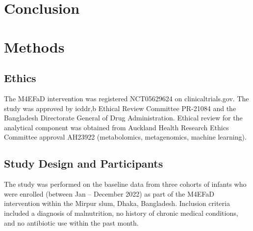 \documentclass{article}
\begin{document}
\section*{Conclusion}

\section*{Methods}
\subsection*{Ethics}
The M4EFaD intervention was registered NCT05629624 on clinicaltrials.gov.
The study was approved by icddr,b Ethical Review Committee PR-21084 and the Bangladesh Directorate General of Drug Administration.
Ethical review for the analytical component was obtained from Auckland Health Research Ethics Committee approval AH23922 (metabolomics, metagenomics, machine learning).

\subsection*{Study Design and Participants}
The study was performed on the baseline data from three cohorts of infants who were enrolled (between Jan – December 2022) as part of the M4EFaD intervention within the Mirpur slum, Dhaka, Bangladesh.
Inclusion criteria included a diagnosis of malnutrition, no history of chronic medical conditions, and no antibiotic use within the past month.
\end{document}
